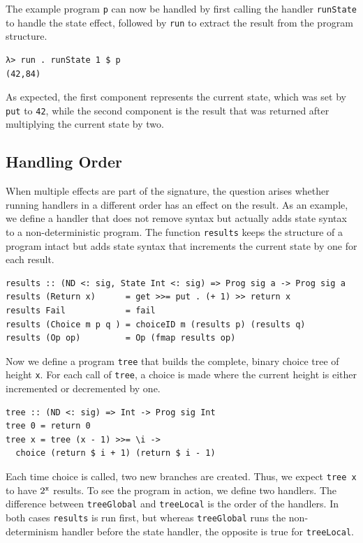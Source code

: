 \documentclass[a4paper, 11pt, fleqn, twoside, abstract=on]{scrreprt}
\newcommand{\hinl}[1]{\texttt{#1}}
\begin{document}
The example program \hinl{p} can now be handled by first calling the handler \hinl{runState} to handle the state effect, followed by \hinl{run} to extract the result from the program structure.

\begin{verbatim}
λ> run . runState 1 $ p
(42,84)
\end{verbatim}

As expected, the first component represents the current state, which was set by \hinl{put} to \hinl{42}, while the second component is the result that was returned after multiplying the current state by two.

\subsection{Handling Order}
When multiple effects are part of the signature, the question arises whether running handlers in a different order has an effect on the result.
As an example, we define a handler that does not remove syntax but actually adds state syntax to a non-deterministic program.
The function \hinl{results} keeps the structure of a program intact but adds state syntax that increments the current state by one for each result.

\begin{verbatim}
results :: (ND <: sig, State Int <: sig) => Prog sig a -> Prog sig a
results (Return x)      = get >>= put . (+ 1) >> return x
results Fail            = fail
results (Choice m p q ) = choiceID m (results p) (results q)
results (Op op)         = Op (fmap results op)
\end{verbatim}

Now we define a program \hinl{tree} that builds the complete, binary choice tree of height \hinl{x}.
For each call of \hinl{tree}, a choice is made where the current height is either incremented or decremented by one.

\begin{verbatim}
tree :: (ND <: sig) => Int -> Prog sig Int
tree 0 = return 0
tree x = tree (x - 1) >>= \i -> 
  choice (return $ i + 1) (return $ i - 1)
\end{verbatim}

Each time choice is called, two new branches are created.
Thus, we expect \hinl{tree x} to have $2^\text{\hinl{x}}$ results.
To see the program in action, we define two handlers.
The difference between \hinl{treeGlobal} and \hinl{treeLocal} is the order of the handlers.
In both cases \hinl{results} is run first, but whereas \hinl{treeGlobal} runs the non-determinism handler before the state handler, the opposite is true for \hinl{treeLocal}.
\end{document}
